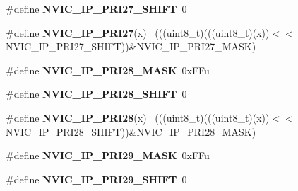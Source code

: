 \begin{DoxyCompactItemize}
\item 
\hypertarget{group___n_v_i_c___register___masks_ga76765cac0d13b476bbb50d001e5fabf6}{}\#define {\bfseries N\+V\+I\+C\+\_\+\+I\+P\+\_\+\+P\+R\+I27\+\_\+\+S\+H\+I\+F\+T}~0\label{group___n_v_i_c___register___masks_ga76765cac0d13b476bbb50d001e5fabf6}

\item 
\hypertarget{group___n_v_i_c___register___masks_ga5b06d9b71f5699c4cdea57d73053320a}{}\#define {\bfseries N\+V\+I\+C\+\_\+\+I\+P\+\_\+\+P\+R\+I27}(x)                                              ~(((uint8\+\_\+t)(((uint8\+\_\+t)(x))$<$$<$N\+V\+I\+C\+\_\+\+I\+P\+\_\+\+P\+R\+I27\+\_\+\+S\+H\+I\+F\+T))\&N\+V\+I\+C\+\_\+\+I\+P\+\_\+\+P\+R\+I27\+\_\+\+M\+A\+S\+K)\label{group___n_v_i_c___register___masks_ga5b06d9b71f5699c4cdea57d73053320a}

\item 
\hypertarget{group___n_v_i_c___register___masks_gae730888f73dad6ea5d495d47dbec6b16}{}\#define {\bfseries N\+V\+I\+C\+\_\+\+I\+P\+\_\+\+P\+R\+I28\+\_\+\+M\+A\+S\+K}~0x\+F\+Fu\label{group___n_v_i_c___register___masks_gae730888f73dad6ea5d495d47dbec6b16}

\item 
\hypertarget{group___n_v_i_c___register___masks_ga9479c6cbd53dda17950c1a0f26a8246b}{}\#define {\bfseries N\+V\+I\+C\+\_\+\+I\+P\+\_\+\+P\+R\+I28\+\_\+\+S\+H\+I\+F\+T}~0\label{group___n_v_i_c___register___masks_ga9479c6cbd53dda17950c1a0f26a8246b}

\item 
\hypertarget{group___n_v_i_c___register___masks_ga532c1e5c2ec0d32dc1b1e7e711d4e133}{}\#define {\bfseries N\+V\+I\+C\+\_\+\+I\+P\+\_\+\+P\+R\+I28}(x)                                              ~(((uint8\+\_\+t)(((uint8\+\_\+t)(x))$<$$<$N\+V\+I\+C\+\_\+\+I\+P\+\_\+\+P\+R\+I28\+\_\+\+S\+H\+I\+F\+T))\&N\+V\+I\+C\+\_\+\+I\+P\+\_\+\+P\+R\+I28\+\_\+\+M\+A\+S\+K)\label{group___n_v_i_c___register___masks_ga532c1e5c2ec0d32dc1b1e7e711d4e133}

\item 
\hypertarget{group___n_v_i_c___register___masks_ga701432ea62b9440be077b1514502c740}{}\#define {\bfseries N\+V\+I\+C\+\_\+\+I\+P\+\_\+\+P\+R\+I29\+\_\+\+M\+A\+S\+K}~0x\+F\+Fu\label{group___n_v_i_c___register___masks_ga701432ea62b9440be077b1514502c740}

\item 
\hypertarget{group___n_v_i_c___register___masks_ga9d795094f3e5be211ceeb25b4e20a015}{}\#define {\bfseries N\+V\+I\+C\+\_\+\+I\+P\+\_\+\+P\+R\+I29\+\_\+\+S\+H\+I\+F\+T}~0\label{group___n_v_i_c___register___masks_ga9d795094f3e5be211ceeb25b4e20a015}


\end{DoxyCompactItemize}
